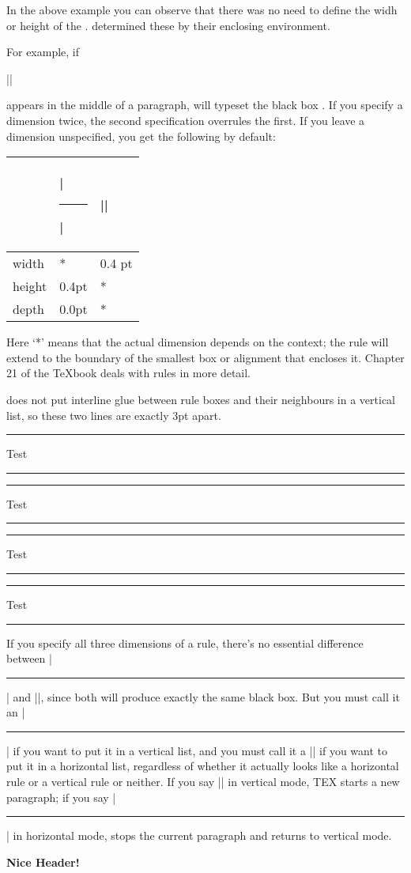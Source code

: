 \begin{teX}
\noindent In the above example you can observe that there was no need to define the widh or height of the . \tex determined these by their enclosing environment.

For example, if

|\vrule height4pt width3pt depth2pt|

\def\smallbox{\vrule height4pt width3pt depth2pt}

\noindent appears in the middle of a paragraph, \tex will typeset the black box \smallbox. If you specify a dimension twice, the second specification overrules the first. If you leave a dimension unspecified, you get the following by default:

\begin{tabular}{lll}
\toprule
~     &|\hrule| &|\vrule|\\
\midrule
width &*        &0.4 pt\\
height&0.4pt    &*\\
depth &0.0pt    &*\\
\bottomrule
\end{tabular}
\medskip


Here `*' means that the actual dimension depends on the context; the rule will extend to the boundary of the smallest box or alignment that encloses it. Chapter 21 of the TeXbook deals with rules in more detail.

\tex does not put interline glue between rule boxes and their neighbours in a vertical list, so these two lines are exactly 3pt apart. 
\begin{teX}
\hrule width50pt Test \hrule width50pt
\vskip3pt
\hrule width50pt Test \hrule width50pt
\end{teX}

\hrule width50pt Test \hrule width50pt
\vskip3pt
\hrule width50pt Test \hrule width50pt
\medskip

If you specify all three dimensions of a rule, there's no essential difference
between |\hrule| and |\vrule|, since both will produce exactly the same black
box. But you must call it an |\hrule| if you want to put it in a vertical list, and you
must call it a |\vrule| if you want to put it in a horizontal list, regardless of whether it
actually looks like a horizontal rule or a vertical rule or neither. If you say |\vrule| in vertical mode, TEX starts a new paragraph; if you say |\hrule| in horizontal mode, \tex stops the current paragraph and returns to vertical mode.

\begin{teX}
\centerline{\vrule height 4pt width 6cm}
\medskip
\centerline{\bf Nice Header!}
\medskip
\centerline{\vrule height 4pt width 6cm}
\end{teX}


\end{teX}
